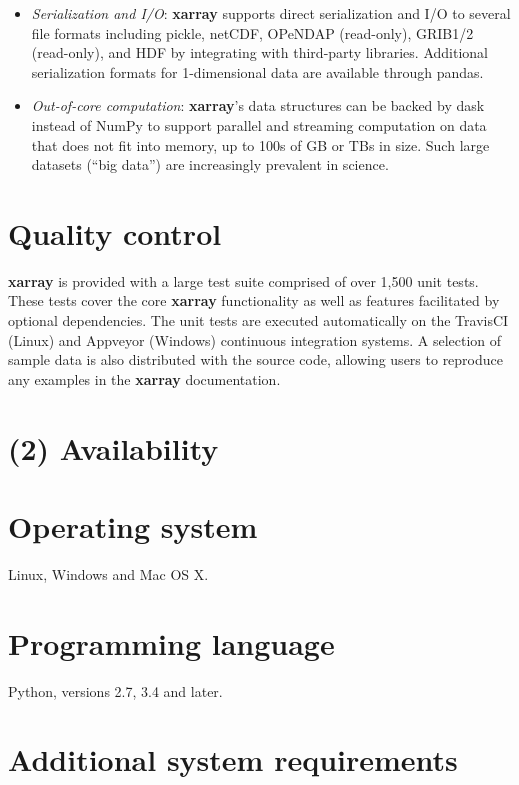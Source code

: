 \documentclass{jors}
\begin{document}
\begin{itemize}
	\item \textit{Serialization and I/O}: \textbf{xarray} supports direct serialization and I/O to several file formats including pickle, netCDF, OPeNDAP (read-only), GRIB1/2 (read-only), and HDF by integrating with third-party libraries.
	Additional serialization formats for 1-dimensional data are available through pandas.
	\item \textit{Out-of-core computation}: \textbf{xarray}'s data structures can be backed by dask \cite{dask} instead of NumPy to support parallel and streaming computation on data that does not fit into memory, up to 100s of GB or TBs in size. Such large datasets (``big data'') are increasingly prevalent in science.
\end{itemize}

\section*{Quality control}

\textbf{xarray} is provided with a large test suite comprised of over 1,500 unit tests.
These tests cover the core \textbf{xarray} functionality as well as features facilitated by optional dependencies.
The unit tests are executed automatically on the TravisCI (Linux) \citep{TravisCI} and Appveyor (Windows) \citep{Appveyor} continuous integration systems.
A selection of sample data is also distributed with the source code, allowing users to reproduce any examples in the \textbf{xarray} documentation.

\section*{(2) Availability}
\vspace{0.5cm}
\section*{Operating system}

Linux, Windows and Mac OS X.

\section*{Programming language}

Python, versions 2.7, 3.4 and later.

\section*{Additional system requirements}
\end{document}
